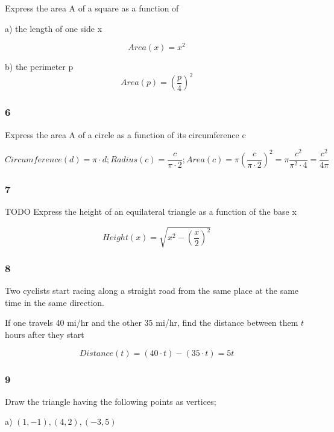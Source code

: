\documentclass[]{report}
\begin{document}
Express the area A of a square as a function of 

a) the length of one side x

\[
Area(x) = x^2
\]

b) the perimeter p
\[
Area(p) = (\frac{p}{4})^2
\]

\subsubsection{6}

Express the area A of a circle as a function of its circumference c

\[
Circumference(d) = \pi \cdot d;
Radius(c) = \frac{c}{\pi \cdot 2};
Area(c) = \pi (\frac{c}{\pi \cdot 2})^2 = \pi \frac{c^2}{\pi^2 \cdot 4} = \frac{c^2}{4\pi}
\]

\subsubsection{7} TODO
Express the height of an equilateral triangle as a function of the base x

\[
Height(x) = \sqrt{x^2 - (\frac{x}{2})^2}
\]

\subsubsection{8}
Two cyclists start racing along a straight road from the same place at the same time in the same direction.

If one travels 40 mi/hr and the other 35 mi/hr, find the distance between them $t$ hours after they start

\[
Distance(t) = (40\cdot t) - (35\cdot t) = 5t
\]

\subsubsection{9}

Draw the triangle having the following points as vertices;

a) $(1, -1), (4, 2), (-3, 5)$

\end{document}
